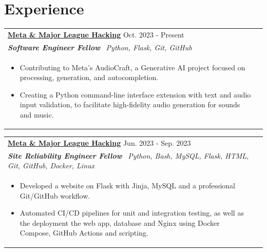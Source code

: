 \documentclass{article}
\begin{document}
\section{Experience}
\begin{tabularx}{\linewidth}{ @{}l r@{} }
\textbf{\uline{\href{https://github.com/}{Meta \& Major League Hacking}}} \hfill \color[HTML]{371e77} Oct. 2023 - Present \\[4pt]
\color[HTML]{371e77}\textbf{\textit{Software Engineer Fellow}}\ \hfill \color[HTML]{4B28A4} \textit{Python, Flask, Git, GitHub} \\[5pt]
\begin{minipage}[t]{\linewidth}
    \begin{itemize}[nosep,after=\strut, leftmargin=2em, itemsep=2pt]
        \item Contributing to Meta's AudioCraft, a Generative AI project focused on processing, generation, and autocompletion.
        \item Creating a Python command-line interface extension with text and audio input validation, to facilitate high-fidelity audio generation for sounds and music.
    \end{itemize}
\end{minipage}
\end{tabularx}

\begin{tabularx}{\linewidth}{ @{}l r@{} }
\color[HTML]{1C033C} \textbf{\uline{\href{https://github.com/}{Meta \& Major League Hacking}}} \hfill \color[HTML]{371e77} Jun. 2023 - Sep. 2023 \\[4pt]
\color[HTML]{371e77}\textbf{\textit{Site Reliability Engineer Fellow}}\ \hfill \color[HTML]{4B28A4} \textit{Python, Bash, MySQL, Flask, HTML, Git, GitHub, Docker, Linux} \\[5pt]
\begin{minipage}[t]{\linewidth}
    \begin{itemize}[nosep,after=\strut, leftmargin=2em, itemsep=2pt]
        \item Developed a website on Flask with Jinja, MySQL and a professional Git/GitHub workflow.
        \item Automated CI/CD pipelines for unit and integration testing, as well as the deployment the web app, database and Nginx using Docker Compose, GitHub Actions and scripting.
    \end{itemize}
\end{minipage}
\end{tabularx}
\end{document}
